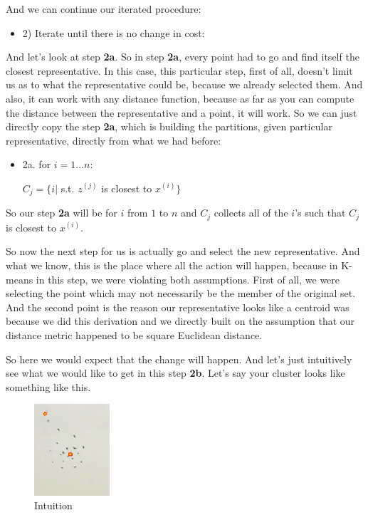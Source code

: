 \documentclass[a4paper, 12pt]{article}
\begin{document}
And we can continue our iterated procedure:
\begin{itemize}
\item 2) Iterate until there is no change in cost:
\end{itemize}

And let's look at step \textbf{2a}. So in step \textbf{2a}, every point had to go and find
itself the closest representative. In this case, this particular step, first of
all, doesn't limit us as to what the representative could be, because we already
selected them. And also, it can work with any distance function, because as far
as you can compute the distance between the representative and a point, it will
work. So we can just directly copy the step \textbf{2a}, which is building the
partitions, given particular representative, directly from what we had before:

\begin{itemize}
\item 2a. for \(i=1 \ldots n\):

\(C_j = \{i|\) s.t. \(z^{(j)}\) is closest to \(x^{(i)}\}\)
\end{itemize}


So our step \textbf{2a} will be for \(i\) from \(1\) to \(n\) and \(C_j\) collects all
of the \(i\)'s such that \(C_j\) is closest to \(x^{(i)}\).

So now the next step for us is actually go and select the new representative.
And what we know, this is the place where all the action will happen, because in
K-means in this step, we were violating both assumptions. First of all, we were
selecting the point which may not necessarily be the member of the original set.
And the second point is the reason our representative looks like a centroid was
because we did this derivation and we directly built on the assumption that our
distance metric happened to be square Euclidean distance.

So here we would expect that the change will happen. And let's just intuitively
see what we would like to get in this step \textbf{2b}. Let's say your cluster looks
like something like this.

\begin{figure}[H]
\centering
\includegraphics[width=0.25\textwidth]{./pic/u04-l14-03-fig-01.png}
\caption{\label{fig:orgc2cc50d}Intuition}
\end{figure}
\end{document}
